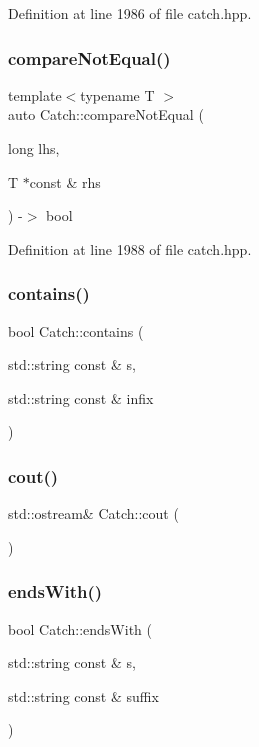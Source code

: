 Definition at line 1986 of file catch.\+hpp.

\mbox{\label{namespace_catch_a3db634a0adf44a1148767ba149ccf34d}} 
\subsubsection{compareNotEqual()\hspace{0.1cm}{\footnotesize\ttfamily [5/5]}}
{\footnotesize\ttfamily template$<$typename T $>$ \\
auto Catch\+::compare\+Not\+Equal (\begin{DoxyParamCaption}\item[{long}]{lhs,  }\item[{T $\ast$const \&}]{rhs }\end{DoxyParamCaption}) -\/$>$ bool }



Definition at line 1988 of file catch.\+hpp.

\mbox{\label{namespace_catch_aa52974b0e426e7e2fbd725a900e9c36e}} 
\subsubsection{contains()}
{\footnotesize\ttfamily bool Catch\+::contains (\begin{DoxyParamCaption}\item[{std\+::string const \&}]{s,  }\item[{std\+::string const \&}]{infix }\end{DoxyParamCaption})}

\mbox{\label{namespace_catch_a50af73c5a37ad5c6558df4ce4a275e83}} 
\subsubsection{cout()}
{\footnotesize\ttfamily std\+::ostream\& Catch\+::cout (\begin{DoxyParamCaption}{ }\end{DoxyParamCaption})}

\mbox{\label{namespace_catch_ada025504f627feaf9ac68ca391515dff}} 
\subsubsection{endsWith()\hspace{0.1cm}{\footnotesize\ttfamily [1/2]}}
{\footnotesize\ttfamily bool Catch\+::ends\+With (\begin{DoxyParamCaption}\item[{std\+::string const \&}]{s,  }\item[{std\+::string const \&}]{suffix }\end{DoxyParamCaption})}

